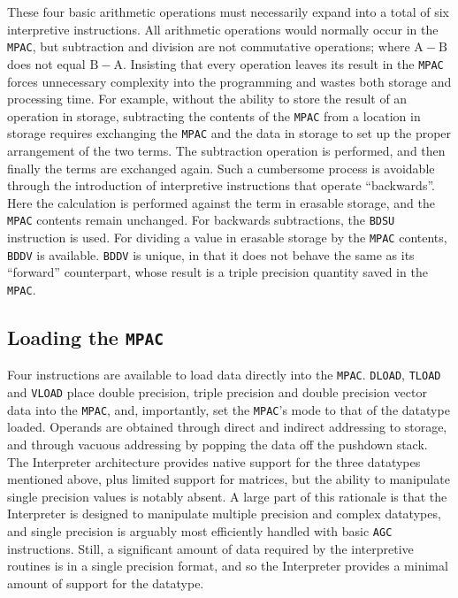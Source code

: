 \documentclass[refcap, oxford]{ahsan}
\begin{document}
These four basic arithmetic operations must necessarily expand into a total of six interpretive instructions. All arithmetic operations would normally occur in the \texttt{MPAC}, but subtraction and division are not commutative operations; where $\mathrm{A}-\mathrm{B}$\\
does not equal $\mathrm{B}-\mathrm{A}$. Insisting that every operation leaves its result in the \texttt{MPAC} forces unnecessary complexity into the programming and wastes both storage and processing time. For example, without the ability to store the result of an operation in storage, subtracting the contents of the \texttt{MPAC} from a location in storage requires exchanging the \texttt{MPAC} and the data in storage to set up the proper arrangement of the two terms. The subtraction operation is performed, and then finally the terms are exchanged again. Such a cumbersome process is avoidable through the introduction of interpretive instructions that operate ``backwards''. Here the calculation is performed against the term in erasable storage, and the \texttt{MPAC} contents remain unchanged. For backwards subtractions, the \texttt{BDSU} instruction is used. For dividing a value in erasable storage by the \texttt{MPAC} contents, \texttt{BDDV} is available. \texttt{BDDV} is unique, in that it does not behave the same as its ``forward'' counterpart, whose result is a triple precision quantity saved in the \texttt{MPAC}.


\subsection{Loading the \texttt{MPAC}}
Four instructions are available to load data directly into the \texttt{MPAC}. \texttt{DLOAD}, \texttt{TLOAD} and \texttt{VLOAD} place double precision, triple precision and double precision vector data into the \texttt{MPAC}, and, importantly, set the \texttt{MPAC}'s mode to that of the datatype loaded. Operands are obtained through direct and indirect addressing to storage, and through vacuous addressing by popping the data off the pushdown stack. The Interpreter architecture provides native support for the three datatypes mentioned above, plus limited support for matrices, but the ability to manipulate single precision values is notably absent. A large part of this rationale is that the Interpreter is designed to manipulate multiple precision and complex datatypes, and single precision is arguably most efficiently handled with basic \texttt{AGC} instructions. Still, a significant amount of data required by the interpretive routines is in a single precision format, and so the Interpreter provides a minimal amount of support for the datatype.
\end{document}
